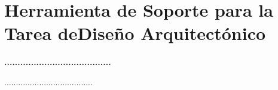 \section{ Herramienta de Soporte para la Tarea deDiseño Arquitectónico} 
\textbf{........................................}\\
\begin{flushleft}
......................................
\end{flushleft}